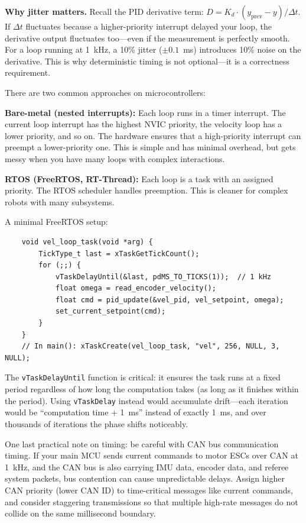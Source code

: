 \textbf{Why jitter matters.} Recall the PID derivative term: $D = K_d \cdot (y_{\text{prev}} - y) / \Delta t$. If $\Delta t$ fluctuates because a higher-priority interrupt delayed your loop, the derivative output fluctuates too---even if the measurement is perfectly smooth. For a loop running at 1~kHz, a 10\% jitter ($\pm 0.1$~ms) introduces 10\% noise on the derivative. This is why deterministic timing is not optional---it is a correctness requirement.

There are two common approaches on microcontrollers:

\textbf{Bare-metal (nested interrupts):} Each loop runs in a timer interrupt. The current loop interrupt has the highest NVIC priority, the velocity loop has a lower priority, and so on. The hardware ensures that a high-priority interrupt can preempt a lower-priority one. This is simple and has minimal overhead, but gets messy when you have many loops with complex interactions.

\textbf{RTOS (FreeRTOS, RT-Thread):} Each loop is a task with an assigned priority. The RTOS scheduler handles preemption. This is cleaner for complex robots with many subsystems.

A minimal FreeRTOS setup:

\begin{verbatim}
    void vel_loop_task(void *arg) {
        TickType_t last = xTaskGetTickCount();
        for (;;) {
            vTaskDelayUntil(&last, pdMS_TO_TICKS(1));  // 1 kHz
            float omega = read_encoder_velocity();
            float cmd = pid_update(&vel_pid, vel_setpoint, omega);
            set_current_setpoint(cmd);
        }
    }
    // In main(): xTaskCreate(vel_loop_task, "vel", 256, NULL, 3, NULL);
\end{verbatim}

The \texttt{vTaskDelayUntil} function is critical: it ensures the task runs at a fixed period regardless of how long the computation takes (as long as it finishes within the period). Using \texttt{vTaskDelay} instead would accumulate drift---each iteration would be ``computation time + 1~ms'' instead of exactly 1~ms, and over thousands of iterations the phase shifts noticeably.

One last practical note on timing: be careful with CAN bus communication timing. If your main MCU sends current commands to motor ESCs over CAN at 1~kHz, and the CAN bus is also carrying IMU data, encoder data, and referee system packets, bus contention can cause unpredictable delays. Assign higher CAN priority (lower CAN ID) to time-critical messages like current commands, and consider staggering transmissions so that multiple high-rate messages do not collide on the same millisecond boundary.

